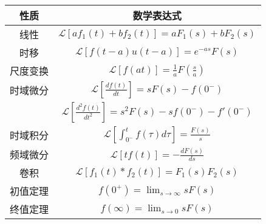 \begin{tabular}{c|c}
性质 & 数学表达式 \\
\hline
线性 & $\mathcal{L}[af_1(t)+bf_2(t)] = aF_1(s)+bF_2(s)$ \\
\hline
时移 & $\mathcal{L}[f(t-a)u(t-a)] = e^{-as}F(s)$ \\
\hline
尺度变换 & $\mathcal{L}[f(at)] = \frac{1}{a}F(\frac{s}{a})$ \\
\hline
时域微分 & $\mathcal{L}[\frac{df(t)}{dt}] = sF(s) - f(0^-)$ \\
 & $\mathcal{L}[\frac{d^2f(t)}{dt^2}] = s^2F(s) - sf(0^-) - f'(0^-)$ \\
\hline
时域积分 & $\mathcal{L}[\int_{0^-}^{t}f(\tau)d\tau] = \frac{F(s)}{s}$ \\
\hline
频域微分 & $\mathcal{L}[tf(t)] = -\frac{dF(s)}{ds}$ \\
\hline
卷积 & $\mathcal{L}[f_1(t)*f_2(t)] = F_1(s)F_2(s)$ \\
\hline
初值定理 & $f(0^+) = \lim_{s\to\infty}sF(s)$ \\
\hline
终值定理 & $f(\infty) = \lim_{s\to 0}sF(s)$ \\
\end{tabular}

